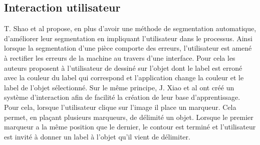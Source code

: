 \subsection{Interaction utilisateur}
T. Shao et al\cite{interactiveSeg} propose, en plus d'avoir une méthode de segmentation automatique, d'améliorer leur 
segmentation en impliquant l'utilisateur dans le processus. Ainsi lorsque la segmentation d'une pièce comporte des erreurs, 
l'utilisateur est amené à rectifier les erreurs de la machine au travers d'une interface.
Pour cela les auteurs proposent à l'utilisateur de dessiné sur l'objet dont le label est erroné avec la couleur du label 
qui correspond et l'application change la couleur et le label de l'objet sélectionné. Sur le même principe, J. Xiao et al\cite{interactionSeg2}
ont créé un système d'interaction afin de facilité la création de leur base d'apprentissage. Pour cela, lorsque l'utilisateur 
clique sur l'image il place un marqueur. Cela permet, en plaçant plusieurs marqueurs, de délimité un objet. Lorsque le premier
marqueur a la même position que le dernier, le contour est terminé et l'utilisateur est invité à donner un label à l'objet
qu'il vient de délimiter.
